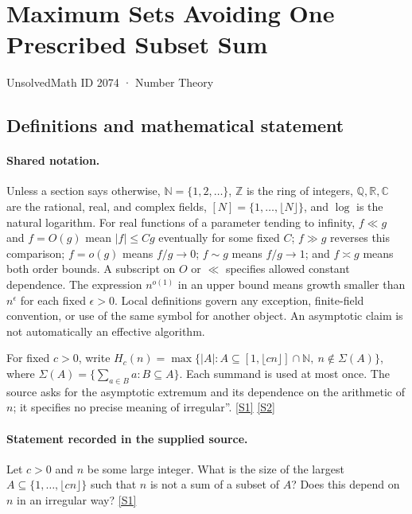 \documentclass[11pt,a4paper]{article}
\newcommand{\N}{\mathbb{N}}
\newcommand{\Z}{\mathbb{Z}}
\newcommand{\Q}{\mathbb{Q}}
\newcommand{\R}{\mathbb{R}}
\newcommand{\C}{\mathbb{C}}
\newcommand{\sref}[2]{\hyperlink{source:#1:#2}{[S#2]}}
\begin{document}

\setcounter{section}{2073}

\section{Maximum Sets Avoiding One Prescribed Subset Sum}\label{2074}

{\small\sffamily UnsolvedMath ID 2074 · Number Theory}

\subsection{Definitions and mathematical statement}

\paragraph{Shared notation.}Unless a section says otherwise, $\N=\{1,2,\ldots\}$,
$\Z$ is the ring of integers, $\Q,\R,\C$ are the rational, real, and complex
fields, $[N]=\{1,\ldots,\lfloor N\rfloor\}$, and $\log$ is the natural
logarithm. For real functions of a parameter tending to infinity,
$f\ll g$ and $f=O(g)$ mean $|f|\leq Cg$ eventually for some fixed $C$;
$f\gg g$ reverses this comparison; $f=o(g)$ means $f/g\to0$;
$f\sim g$ means $f/g\to1$; and $f\asymp g$ means both order bounds.
A subscript on $O$ or $\ll$ specifies allowed constant dependence.
The expression $n^{o(1)}$ in an upper bound means growth smaller than
$n^\epsilon$ for each fixed $\epsilon>0$. Local definitions govern any
exception, finite-field convention, or use of the same symbol for another
object. An asymptotic claim is not automatically an effective algorithm.



For fixed $c>0$, write $H_c(n)=\max\{|A|:A\subseteq[1,\lfloor cn\rfloor]\cap\N,\ n\notin\Sigma(A)\}$, where $\Sigma(A)=\{\sum_{a\in B}a:B\subseteq A\}$. Each summand is used at most once. The source asks for the asymptotic extremum and its dependence on the arithmetic of $n$; it specifies no precise meaning of irregular''. \sref{2074}{1} \sref{2074}{2}

\paragraph{Statement recorded in the supplied source.}
Let $c>0$ and $n$ be some large integer. What is the size of the largest $A\subseteq \{1,\ldots,\lfloor cn\rfloor\}$ such that $n$ is not a sum of a subset of $A$? Does this depend on $n$ in an irregular way? \sref{2074}{1}
\end{document}
